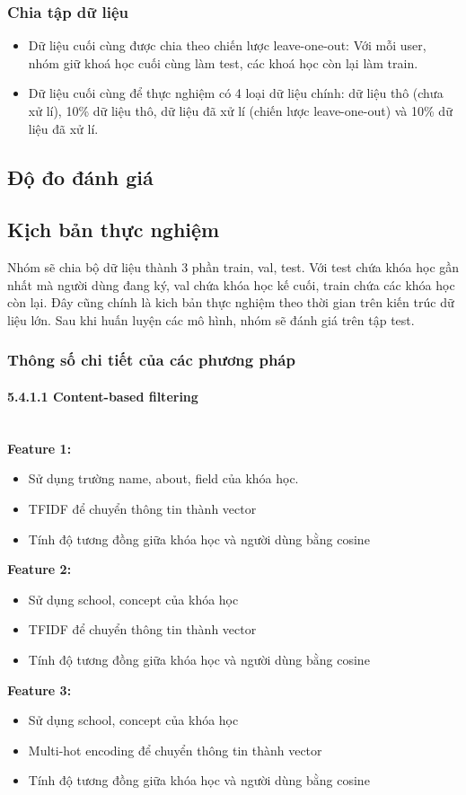 \subsubsection{Chia tập dữ liệu}
\begin{itemize}
    \item Dữ liệu cuối cùng được chia theo chiến lược leave-one-out: Với mỗi user, nhóm giữ khoá học cuối cùng làm test, các khoá học còn lại làm train. 
    \item Dữ liệu cuối cùng để thực nghiệm có 4 loại dữ liệu chính: dữ liệu thô (chưa xử lí), 10\% dữ liệu thô, dữ liệu đã xử lí (chiến lược leave-one-out) và 10\% dữ liệu đã xử lí.
\end{itemize}

\subsection{Độ đo đánh giá}
\subsection{Kịch bản thực nghiệm}
Nhóm sẽ chia bộ dữ liệu thành 3 phần train, val, test. Với test chứa khóa học gần nhất mà người dùng đang ký, val chứa khóa học kế cuối, train chứa các khóa học còn lại. Đây cũng chính là kich bản thực nghiệm theo thời gian trên kiến trúc dữ liệu lớn. Sau khi huấn luyện các mô hình, nhóm sẽ đánh giá trên tập test.
\subsubsection{Thông số chi tiết của các phương pháp}
\paragraph{5.4.1.1  Content-based filtering}
\textbf{}\\
\textbf{Feature 1:} 
\begin{itemize}
    \item Sử dụng trường name, about, field của khóa học.
    \item TFIDF để chuyển thông tin thành vector
    \item Tính độ tương đồng giữa khóa học và người dùng bằng cosine
\end{itemize}
\textbf{Feature 2:}
\begin{itemize}
    \item Sử dụng school, concept của khóa học
    \item TFIDF để chuyển thông tin thành vector
    \item Tính độ tương đồng giữa khóa học và người dùng bằng cosine
\end{itemize}
\textbf{Feature 3:} 
\begin{itemize}
    \item Sử dụng school, concept của khóa học
    \item Multi-hot encoding để chuyển thông tin thành vector
    \item Tính độ tương đồng giữa khóa học và người dùng bằng cosine
\end{itemize}
